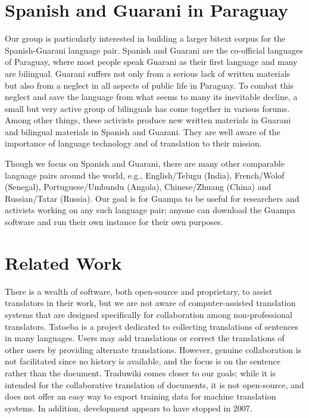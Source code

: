 \documentclass[10pt, a4paper]{article}
\begin{document}
\section{Spanish and Guarani in Paraguay}
Our group is particularly interested in building a larger bitext corpus for the
Spanish-Guarani language pair. Spanish and Guarani are the co-official
languages of Paraguay, where most people speak Guarani as their first language
and many are bilingual. Guarani suffers not only from a serious lack of
written materials but also from a neglect in all aspects of public life in
Paraguay. To combat this neglect and save the language from what seems to many
its inevitable decline, a small but very active group of bilinguals has come
together in various forums. Among other things, these activists produce new
written materials in Guarani and bilingual materials in Spanish and Guarani.
They are well aware of the importance of language technology and of translation
to their mission.

Though we focus on Spanish and Guarani, there are many other comparable
language pairs around the world, e.g., English/Telugu (India), French/Wolof
(Senegal), Portuguese/Umbundu (Angola), Chinese/Zhuang (China) and
Russian/Tatar (Russia). Our goal is for Guampa to be useful for researchers and
activists working on any such language pair; anyone can download the Guampa
software and run their own instance for their own purposes.

\section{Related Work}
There is a wealth of software, both open-source and proprietary, to assist
translators in their work, but we are not aware of computer-assisted
translation systems that are designed specifically for collaboration among
non-professional translators. Tatoeba \cite{tatoeba} is a
project dedicated to collecting translations of sentences in many languages.
Users may add translations or correct the translations of other users by
providing alternate translations. However, genuine collaboration is not
facilitated since no history is available, and the focus is on the sentence
rather than the document. Traduwiki \cite{traduwiki} comes closer
to our goals; while it is intended for the collaborative translation of
documents, it is not open-source, and does not offer an easy way to export
training data for machine translation systems. In addition, development appears
to have stopped in 2007.
\end{document}
